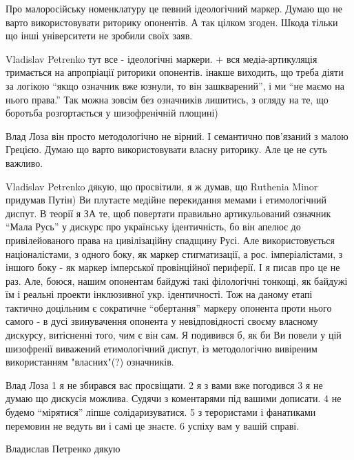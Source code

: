 \begin{itemize}

Про малоросійську номенклатуру це певний ідеологічний маркер. Думаю що не варто
використовувати риторику опонентів. А так цілком згоден. Шкода тільки що інші
університети не зробили своїх заяв.


Vladislav Petrenko тут все - ідеологічні маркери. + вся медіа-артикуляція
тримається на апропріації риторики опонентів. інакше виходить, що треба діяти
за логікою \enquote{якщо означник вже юзнули, то він зашкварений}, і ми
\enquote{не маємо на нього права.} Так можна зовсім без означників лишитись, з
огляду на те, що боротьба розгортається у шизофренічній площині)


Влад Лоза він просто методологічно не вірний. І семантично пов'язаний з малою
Грецією. Думаю що варто використовувати власну риторику. Але це не суть
важливо.


Vladislav Petrenko дякую, що просвітили, я ж думав, що Ruthenia Minor придумав
Путін) Ви плутаєте медійне перекидання мемами і етимологічний диспут. В теорії
я ЗА те, щоб повертати правильно артикульований означник \enquote{Мала Русь} у дискурс
про українську ідентичність, бо він апелює до привілейованого права на
цивілізаційну спадщину Русі. Але використовується націоналістами, з одного
боку, як маркер стигматизації, а рос. імперіалістами, з іншого боку - як маркер
імперської провінційної периферії. І я писав про це не раз. Але, боюся, нашим
опонентам байдужі такі філологічні тонкощі, як байдужі їм і реальні проекти
інклюзивної укр. ідентичності. Тож на даному етапі тактично доцільним є
сократичне \enquote{обертання} маркеру опонента проти нього самого - в дусі
звинувачення опонента у невідповідності своєму власному дискурсу, витісненні
того, чим є він сам. Я подивився б, як би Ви повели у цій шизофренії виважений
етимологічний диспут, із методологічно вивіреним використанням "власних"(?)
означників.


Влад Лоза 1 я не збирався вас просвіщати. 2 я з вами вже погодився 3 я не думаю
що дискусія можлива. Судячи з коментарями під вашими дописати. 4 не будемо
\enquote{мірятися} ліпше солідаризуватися. 5 з терористами і фанатиками перемовин не
ведуть ви і самі це знаєте. 6 успіху вам у вашій справі.

Владислав Петренко дякую


\end{itemize}
